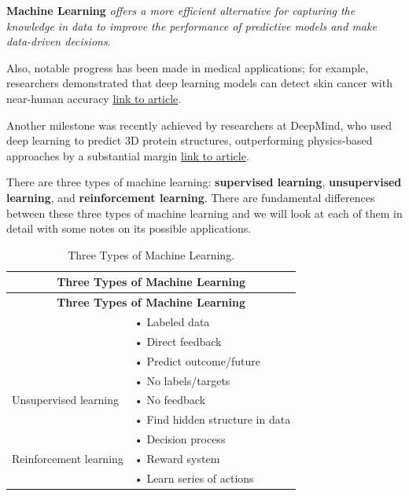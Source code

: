 \documentclass[12pt]{report}
\theoremstyle{largebreak}
\begin{document}
    \begin{obs}
        \textbf{Machine Learning} \textit{offers a more efficient alternative for capturing the knowledge in data to improve the performance of predictive models and make data-driven decisions}.
    \end{obs}
    
    \begin{idea}
        Also, notable progress has been made in medical applications; for example, researchers demonstrated that deep learning models can detect skin cancer with near-human accuracy \href{https://www.nature.com/articles/nature21056}{link to article}.
        
        Another milestone was recently achieved by researchers at DeepMind, who used deep learning to predict 3D protein structures, outperforming physics-based approaches by a substantial margin \href{https://deepmind.com/blog/article/alphafold-a-solution-to-a-50-year-old-grand-challenge-in-biology}{link to article}.  
    \end{idea}
    
    There are three types of machine learning: \textbf{supervised learning}, \textbf{unsupervised learning}, and \textbf{reinforcement learning}. There are fundamental differences between these three types of machine learning and we will look at each of them in detail with some notes on its possible applications.
 
    \begin{longtable}{l p{7cm}}
        \toprule
        \multicolumn{2}{c}{\textbf{Three Types of Machine Learning}} \\
        \midrule
        \endfirsthead
        
        \toprule
        \multicolumn{2}{c}{\textbf{Three Types of Machine Learning}} \\
        \midrule
        \endhead
        
        \bottomrule
        \caption{Three Types of Machine Learning.}
        \label{table:types_machine_learning}
        \endlastfoot
        
        \multirow{3}{*}{Supervised learning} 
        & • Labeled data \\
        & • Direct feedback \\
        & • Predict outcome/future \\
        \hline
        \multirow{3}{*}{Unsupervised learning}
        & • No labels/targets \\
        & • No feedback \\
        & • Find hidden structure in data \\
        \hline
        \multirow{3}{*}{Reinforcement learning}
        & • Decision process \\
        & • Reward system \\
        & • Learn series of actions \\
    \end{longtable}
\end{document}
